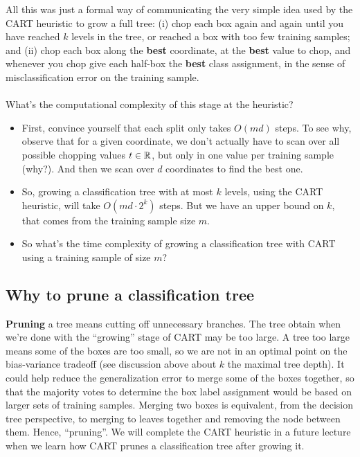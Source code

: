 All this was just a formal way of communicating the very simple idea used by
the CART heuristic to grow a full tree: (i) chop each box again and again until
you have reached $k$ levels in the tree, or reached a box with too few training
samples; and (ii) chop each box along the {\bf best}
coordinate, at the {\bf best} value to chop, and whenever you chop give each
half-box the {\bf best} class assignment, in the sense of misclassification
error on the training sample. 
\\~\\
What's the computational complexity of this stage at the heuristic?
\begin{itemize}
  \item First, convince
yourself that each split only takes $O(md)$ steps. To see why, observe that for a given coordinate,
we don't actually have to scan over all possible chopping values $t\in\mathbb{R}$,
but only in one value per training sample (why?). And then we scan over $d$
coordinates to find the best one. 
\item So, growing a classification tree with at most $k$ levels, using the CART
  heuristic, will take $O(md\cdot 2^k)$ steps. But we have an upper bound on
  $k$, that comes from the training sample size $m$. 
\item So what's the time complexity of growing a classification tree with CART
  using a training sample of size $m$?
\end{itemize}



\subsection{Why to prune a classification tree}

{\bf Pruning} a tree means cutting off unnecessary branches. The tree obtain
when we're done with the ``growing'' stage of CART may be too large. A tree too
large means some of the boxes are too small, so we are not in an optimal point
on the bias-variance tradeoff (see discussion above about $k$ the maximal tree
depth). It could help reduce the generalization error to merge some of the boxes
together, so that the majority votes to determine the box label assignment 
would be based on larger sets of training
samples. Merging two boxes is equivalent, from the decision tree perspective, to
merging to leaves together and removing the node between them. Hence,
``pruning''. We will complete the CART heuristic in a future lecture when we
learn how CART prunes a classification tree after growing it.

